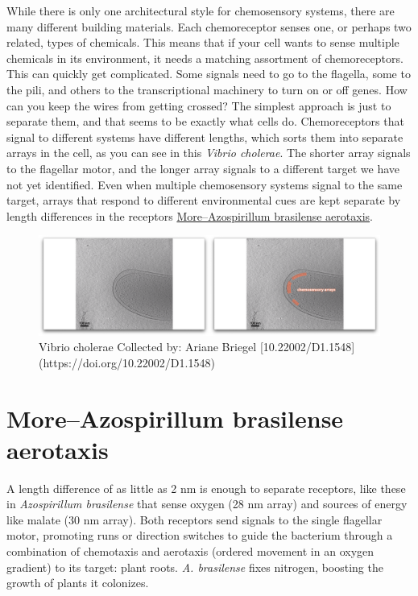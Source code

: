 \documentclass[]{tufte-book}
\begin{document}
While there is only one architectural style for chemosensory systems,
there are many different building materials. Each chemoreceptor senses
one, or perhaps two related, types of chemicals. This means that if your
cell wants to sense multiple chemicals in its environment, it needs a
matching assortment of chemoreceptors. This can quickly get complicated.
Some signals need to go to the flagella, some to the pili, and others to
the transcriptional machinery to turn on or off genes. How can you keep
the wires from getting crossed? The simplest approach is just to
separate them, and that seems to be exactly what cells do.
Chemoreceptors that signal to different systems have different lengths,
which sorts them into separate arrays in the cell, as you can see in
this \emph{Vibrio cholerae}. The shorter array signals to the flagellar
motor, and the longer array signals to a different target we have not
yet identified. Even when multiple chemosensory systems signal to the
same target, arrays that respond to different environmental cues are
kept separate by length differences in the receptors
\protect\hyperlink{moreazospirillum-brasilense-aerotaxis}{More--Azospirillum
brasilense aerotaxis}.

\begin{figure}
\includegraphics{movie_stills/7_4} \caption[Vibrio cholerae Collected by]{Vibrio cholerae Collected by: Ariane Briegel [10.22002/D1.1548](https://doi.org/10.22002/D1.1548)}\label{fig:unnamed-chunk-127}
\end{figure}

\hypertarget{moreazospirillum-brasilense-aerotaxis}{\section{More--Azospirillum
brasilense aerotaxis}\label{moreazospirillum-brasilense-aerotaxis}}

A length difference of as little as 2 nm is enough to separate
receptors, like these in \emph{Azospirillum brasilense} that sense
oxygen (28 nm array) and sources of energy like malate (30 nm array).
Both receptors send signals to the single flagellar motor, promoting
runs or direction switches to guide the bacterium through a combination
of chemotaxis and aerotaxis (ordered movement in an oxygen gradient) to
its target: plant roots. \emph{A. brasilense} fixes nitrogen, boosting
the growth of plants it colonizes.
\end{document}
